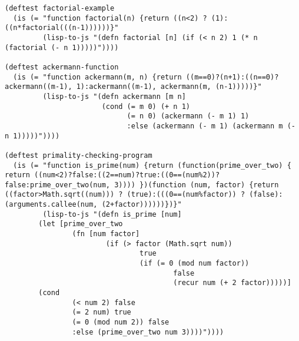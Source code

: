 \begin{verbatim}
(deftest factorial-example
  (is (= "function factorial(n) {return ((n<2) ? (1):((n*factorial(((n-1))))))}"
         (lisp-to-js "(defn factorial [n] (if (< n 2) 1 (* n (factorial (- n 1)))))"))))

(deftest ackermann-function
  (is (= "function ackermann(m, n) {return ((m==0)?(n+1):((n==0)?ackermann((m-1), 1):ackermann((m-1), ackermann(m, (n-1)))))}"
         (lisp-to-js "(defn ackermann [m n]
                       (cond (= m 0) (+ n 1)
                             (= n 0) (ackermann (- m 1) 1)
                             :else (ackermann (- m 1) (ackermann m (- n 1)))))"))))

(deftest primality-checking-program
  (is (= "function is_prime(num) {return (function(prime_over_two) { return ((num<2)?false:((2==num)?true:((0==(num%2))?false:prime_over_two(num, 3)))) })(function (num, factor) {return ((factor>Math.sqrt((num))) ? (true):(((0==(num%factor)) ? (false):(arguments.callee(num, (2+factor))))))})}"
         (lisp-to-js "(defn is_prime [num]
        (let [prime_over_two
                (fn [num factor]
                        (if (> factor (Math.sqrt num))
                                true
                                (if (= 0 (mod num factor))
                                        false
                                        (recur num (+ 2 factor)))))]
        (cond
                (< num 2) false
                (= 2 num) true
                (= 0 (mod num 2)) false
                :else (prime_over_two num 3))))"))))

\end{verbatim}
